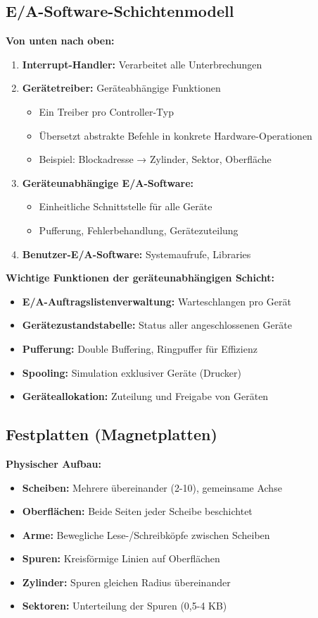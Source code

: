 \documentclass[9pt,a4paper]{extarticle}
\begin{document}
\begin{multicols*}{2}
\subsection{E/A-Software-Schichtenmodell}
\textbf{Von unten nach oben:}
\begin{enumerate}
\item \textbf{Interrupt-Handler:} Verarbeitet alle Unterbrechungen
\item \textbf{Gerätetreiber:} Geräteabhängige Funktionen
  \begin{itemize}
  \item Ein Treiber pro Controller-Typ
  \item Übersetzt abstrakte Befehle in konkrete Hardware-Operationen
  \item Beispiel: Blockadresse → Zylinder, Sektor, Oberfläche
  \end{itemize}
\item \textbf{Geräteunabhängige E/A-Software:}
  \begin{itemize}
  \item Einheitliche Schnittstelle für alle Geräte
  \item Pufferung, Fehlerbehandlung, Gerätezuteilung
  \end{itemize}
\item \textbf{Benutzer-E/A-Software:} Systemaufrufe, Libraries
\end{enumerate}

\textbf{Wichtige Funktionen der geräteunabhängigen Schicht:}
\begin{itemize}
\item \textbf{E/A-Auftragslistenverwaltung:} Warteschlangen pro Gerät
\item \textbf{Gerätezustandstabelle:} Status aller angeschlossenen Geräte
\item \textbf{Pufferung:} Double Buffering, Ringpuffer für Effizienz
\item \textbf{Spooling:} Simulation exklusiver Geräte (Drucker)
\item \textbf{Geräteallokation:} Zuteilung und Freigabe von Geräten
\end{itemize}

\subsection{Festplatten (Magnetplatten)}
\textbf{Physischer Aufbau:}
\begin{itemize}
\item \textbf{Scheiben:} Mehrere übereinander (2-10), gemeinsame Achse
\item \textbf{Oberflächen:} Beide Seiten jeder Scheibe beschichtet
\item \textbf{Arme:} Bewegliche Lese-/Schreibköpfe zwischen Scheiben
\item \textbf{Spuren:} Kreisförmige Linien auf Oberflächen
\item \textbf{Zylinder:} Spuren gleichen Radius übereinander
\item \textbf{Sektoren:} Unterteilung der Spuren (0,5-4 KB)
\end{itemize}


\end{multicols*}
\end{document}
